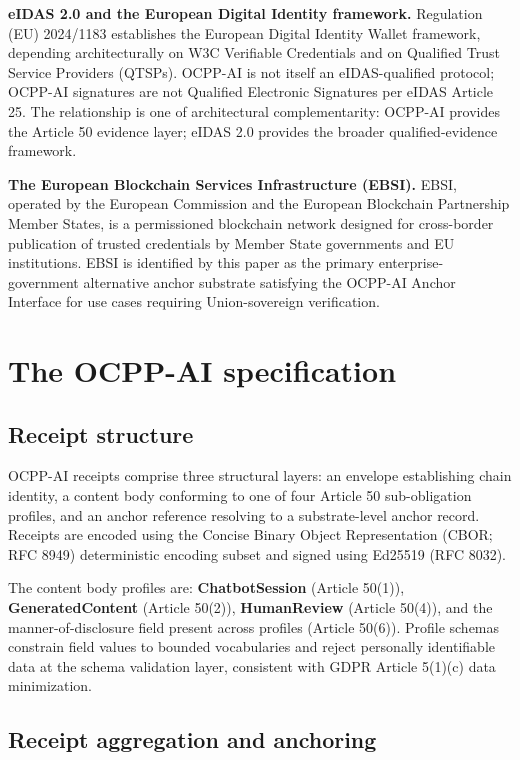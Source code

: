 \documentclass[11pt,a4paper]{article}
\begin{document}
\textbf{eIDAS 2.0 and the European Digital Identity framework.} Regulation (EU) 2024/1183 establishes the European Digital Identity Wallet framework, depending architecturally on W3C Verifiable Credentials and on Qualified Trust Service Providers (QTSPs). OCPP-AI is not itself an eIDAS-qualified protocol; OCPP-AI signatures are not Qualified Electronic Signatures per eIDAS Article 25. The relationship is one of architectural complementarity: OCPP-AI provides the Article 50 evidence layer; eIDAS 2.0 provides the broader qualified-evidence framework.

\textbf{The European Blockchain Services Infrastructure (EBSI).} EBSI, operated by the European Commission and the European Blockchain Partnership Member States, is a permissioned blockchain network designed for cross-border publication of trusted credentials by Member State governments and EU institutions. EBSI is identified by this paper as the primary enterprise-government alternative anchor substrate satisfying the OCPP-AI Anchor Interface for use cases requiring Union-sovereign verification.

\section{The OCPP-AI specification}

\subsection{Receipt structure}

OCPP-AI receipts comprise three structural layers: an envelope establishing chain identity, a content body conforming to one of four Article 50 sub-obligation profiles, and an anchor reference resolving to a substrate-level anchor record. Receipts are encoded using the Concise Binary Object Representation (CBOR; RFC 8949) deterministic encoding subset and signed using Ed25519 (RFC 8032).

The content body profiles are: \textbf{ChatbotSession} (Article 50(1)), \textbf{GeneratedContent} (Article 50(2)), \textbf{HumanReview} (Article 50(4)), and the manner-of-disclosure field present across profiles (Article 50(6)). Profile schemas constrain field values to bounded vocabularies and reject personally identifiable data at the schema validation layer, consistent with GDPR Article 5(1)(c) data minimization.

\subsection{Receipt aggregation and anchoring}
\end{document}
